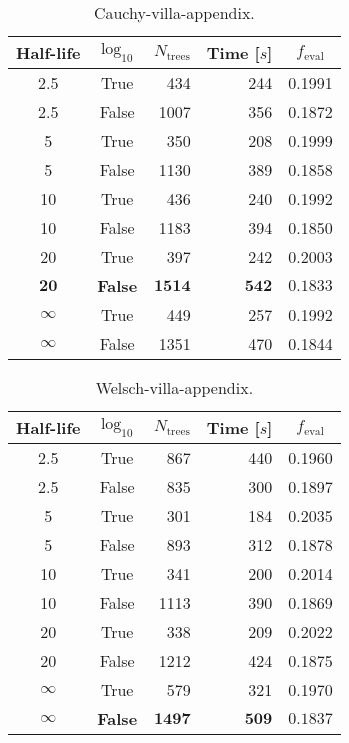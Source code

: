 
\begin{table}[h!]
  \begin{tabular}{@{}ccrrc@{}}
    Half-life & $\log_{10}$ & $N_\mathrm{trees}$ & Time [$s$] & $f_\mathrm{eval}$ \\
    \midrule
    \num{2.5} & True & \num{434} & \num{244} & \num{0.1991} \\
    \num{2.5} & False & \num{1007} & \num{356} & \num{0.1872} \\
    \num{5} & True & \num{350} & \num{208} & \num{0.1999} \\
    \num{5} & False & \num{1130} & \num{389} & \num{0.1858} \\
    \num{10} & True & \num{436} & \num{240} & \num{0.1992} \\
    \num{10} & False & \num{1183} & \num{394} & \num{0.1850} \\
    \num{20} & True & \num{397} & \num{242} & \num{0.2003} \\
    $\mathbf{20}$ & \textbf{False} & $\mathbf{1514}$ & $\mathbf{542}$ & $\mathbf{0.1833}$ \\
    $\infty$ & True & \num{449} & \num{257} & \num{0.1992} \\
    $\infty$ & False & \num{1351} & \num{470} & \num{0.1844} \\
  \end{tabular}
  \caption{\label{tab:h:HPO_initial_Cauchy-villa-appendix}Cauchy-villa-appendix.}
\end{table}


\begin{table}[h!]
  \begin{tabular}{@{}ccrrc@{}}
    Half-life & $\log_{10}$ & $N_\mathrm{trees}$ & Time [$s$] & $f_\mathrm{eval}$ \\
    \midrule
    \num{2.5} & True & \num{867} & \num{440} & \num{0.1960} \\
    \num{2.5} & False & \num{835} & \num{300} & \num{0.1897} \\
    \num{5} & True & \num{301} & \num{184} & \num{0.2035} \\
    \num{5} & False & \num{893} & \num{312} & \num{0.1878} \\
    \num{10} & True & \num{341} & \num{200} & \num{0.2014} \\
    \num{10} & False & \num{1113} & \num{390} & \num{0.1869} \\
    \num{20} & True & \num{338} & \num{209} & \num{0.2022} \\
    \num{20} & False & \num{1212} & \num{424} & \num{0.1875} \\
    $\infty$ & True & \num{579} & \num{321} & \num{0.1970} \\
    $\bm{\infty}$ & \textbf{False} & $\mathbf{1497}$ & $\mathbf{509}$ & $\mathbf{0.1837}$ \\
  \end{tabular}
  \caption{\label{tab:h:HPO_initial_Welsch-villa-appendix}Welsch-villa-appendix.}
\end{table}

